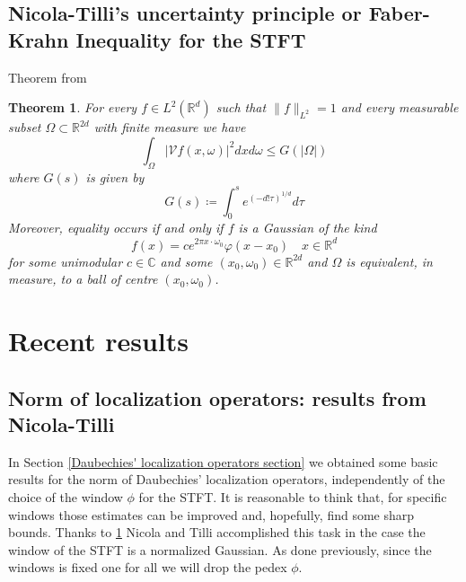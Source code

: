 \documentclass[corpo=11pt, stile=classica, tipotesi=custom,
greek, evenboxes, english]{toptesi}
\numberwithin{equation}{chapter}
\newtheorem{teo}{Theorem}[chapter] %
\newcommand{\R}{\mathbb{R}} %
\newcommand{\V}{\mathcal{V}} %
\newcommand{\C}{\mathbb{C}} %
\newcommand{\dxdo}{dxd\omega}
\begin{document}
\section{Nicola-Tilli's uncertainty principle or Faber-Krahn Inequality for the STFT}\label{section Faber-Krahn inequality fot STFT}
Theorem from \cite{nicolatilli_fk}
\begin{teo}\label{faberkrahn theorem}
	For every $f \in L^2(\R^d)$ such that $\|f\|_{L^2} = 1$ and every measurable subset $\Omega \subset \R^{2d}$ with finite measure we have
	\begin{equation*}
		\int_{\Omega}  |\V f(x,\omega)|^2 \dxdo \leq G(|\Omega|)
	\end{equation*}
	where $G(s)$ is given by
	\begin{equation}\label{G}
		G(s) \coloneqq \int_0^s e^{\left(-d!\tau\right)^{1/d}} d\tau
	\end{equation}
	Moreover, equality occurs if and only if $f$ is a Gaussian of the kind
	\begin{equation}\label{translated Gaussian}
		f(x) = c e^{2 \pi x \cdot \omega_0} \varphi(x-x_0) \quad x \in \R^d
	\end{equation}
	for some unimodular $c \in \C$ and some $(x_0,\omega_0) \in  \R^{2d}$ and $\Omega$ is equivalent, in measure, to a ball of centre $(x_0,\omega_0)$.
\end{teo}

\chapter{Recent results}\label{chapter recent results}
\section{Norm of localization operators: results from Nicola-Tilli}\label{section norm of localization operators}
{\color{blue}In Section \ref{Daubechies' localization operators section} we obtained some basic results for the norm of Daubechies' localization operators, independently of the choice of the window $\phi$ for the STFT. It is reasonable to think that, for specific windows those estimates can be improved and, hopefully, find some sharp bounds. Thanks to \ref{faberkrahn theorem} Nicola and Tilli accomplished this task in the case the window of the STFT is a normalized Gaussian. As done previously, since the windows is fixed one for all we will drop the pedex $\phi$.}
\end{document}
